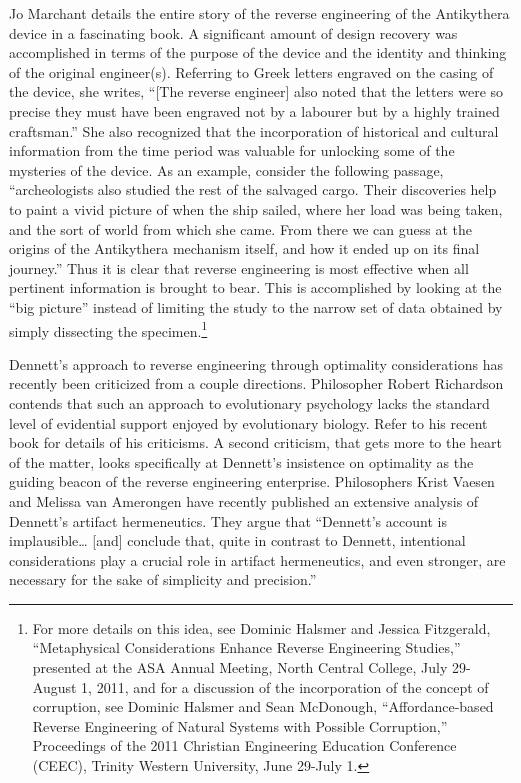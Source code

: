 Jo Marchant details the entire story of the reverse engineering of the
Antikythera device in a fascinating book.\citep{marchant2009} A
significant amount of design recovery was accomplished in terms of the
purpose of the device and the identity and thinking of the original
engineer(s). Referring to Greek letters engraved on the casing of the
device, she writes, “[The reverse engineer] also noted that the letters
were so precise they must have been engraved not by a labourer but by a
highly trained craftsman.”\citep[][pg. 55]{marchant2009} She also recognized that
the incorporation of historical and cultural information from the time
period was valuable for unlocking some of the mysteries of the device.
As an example, consider the following passage, “archeologists also
studied the rest of the salvaged cargo. Their discoveries help to paint
a vivid picture of when the ship sailed, where her load was being
taken, and the sort of world from which she came. From there we can
guess at the origins of the Antikythera mechanism itself, and how it
ended up on its final journey.”\citep[][pg. 61]{marchant2009} Thus it is clear
that reverse engineering is most effective when all pertinent
information is brought to bear. This is accomplished by looking at the
“big picture” instead of limiting the study to the narrow set of data
obtained by simply dissecting the specimen.\footnote{
For more details on this idea, see Dominic Halsmer
and Jessica Fitzgerald, “Metaphysical Considerations Enhance Reverse
Engineering Studies,” presented at the ASA Annual Meeting, North
Central College, July 29-August 1, 2011, and for a discussion of the
incorporation of the concept of corruption, see Dominic Halsmer and
Sean McDonough, “Affordance-based Reverse Engineering of Natural
Systems with Possible Corruption,” Proceedings of the 2011 Christian
Engineering Education Conference (CEEC), Trinity Western University,
June 29-July 1.
}

Dennett’s approach to reverse engineering through optimality
considerations has recently been criticized from a couple directions.
Philosopher Robert Richardson contends that such an approach to
evolutionary psychology lacks the standard level of evidential support
enjoyed by evolutionary biology. Refer to his recent
book\citep{richardson2007} for details of his criticisms. A second
criticism, that gets more to the heart of the matter, looks
specifically at Dennett’s insistence on optimality as the guiding
beacon of the reverse engineering enterprise. Philosophers Krist Vaesen
and Melissa van Amerongen have recently published an extensive analysis
of Dennett’s artifact hermeneutics. They argue that “Dennett’s account
is implausible… [and] conclude that, quite in contrast to Dennett,
intentional considerations play a crucial role in artifact
hermeneutics, and even stronger, are necessary for the sake of
simplicity and precision.”\citep[][pg. 779]{vaesenamerongen2008}

